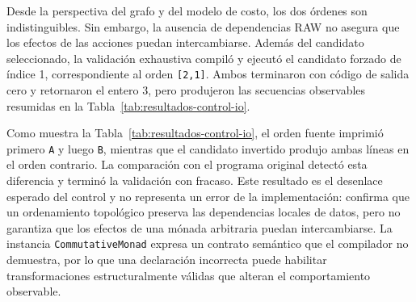 Desde la perspectiva del grafo y del modelo de costo, los dos órdenes son indistinguibles. Sin embargo, la ausencia de dependencias RAW no asegura que los efectos de las acciones puedan intercambiarse. Además del candidato seleccionado, la validación exhaustiva compiló y ejecutó el candidato forzado de índice 1, correspondiente al orden \texttt{[2,1]}. Ambos terminaron con código de salida cero y retornaron el entero 3, pero produjeron las secuencias observables resumidas en la Tabla~\ref{tab:resultados-control-io}.

\begin{table}[ht]
\centering
\TableSetup
{}
\caption{Salidas observables producidas por los dos órdenes del control negativo con \texttt{IO}.}
\label{tab:resultados-control-io}
\end{table}

Como muestra la Tabla~\ref{tab:resultados-control-io}, el orden fuente imprimió primero \texttt{A} y luego \texttt{B}, mientras que el candidato invertido produjo ambas líneas en el orden contrario. La comparación con el programa original detectó esta diferencia y terminó la validación con fracaso. Este resultado es el desenlace esperado del control y no representa un error de la implementación: confirma que un ordenamiento topológico preserva las dependencias locales de datos, pero no garantiza que los efectos de una mónada arbitraria puedan intercambiarse. La instancia \texttt{CommutativeMonad} expresa un contrato semántico que el compilador no demuestra, por lo que una declaración incorrecta puede habilitar transformaciones estructuralmente válidas que alteran el comportamiento observable.
